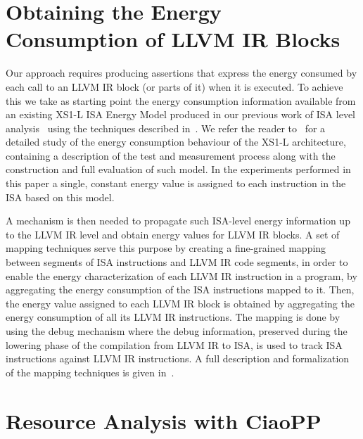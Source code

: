 \documentclass{llncs}
\newcommand{\level}{level\xspace}
\newcommand{\llvmir}{LLVM IR\xspace}
\begin{document}
\section{Obtaining the Energy Consumption of \llvmir Blocks}
\label{sec:energy-model}

Our approach requires producing assertions that express the energy
consumed by each call to an \llvmir block (or parts of it) when it is
executed. To achieve this we take as starting point the energy
consumption information available from an existing XS1-L ISA Energy
Model produced in our previous work of ISA level analysis~\cite{isa-energy-lopstr13-final}
using the techniques described in~\cite{Kerrison13}. 
We refer the reader to~\cite{Kerrison13} for a detailed study
of the energy consumption behaviour of the XS1-L architecture,
containing a description of the test and measurement process along
with the construction and full evaluation of such model. In the
experiments performed in this paper a single, constant energy value is
assigned to each instruction in the ISA based on this model.

A mechanism is then needed to propagate such ISA-\level energy
information up to the \llvmir \level and obtain energy values for
\llvmir blocks. A set of mapping techniques serve this purpose by
creating a fine-grained mapping between segments of ISA instructions
and \llvmir code segments, in order to enable the energy
characterization of each \llvmir instruction in a program, by
aggregating the energy consumption of the ISA instructions mapped to
it. Then, the energy value assigned to each \llvmir block is obtained
by aggregating the energy consumption of all its \llvmir
instructions. The mapping is done by using the debug mechanism 
where the debug information, preserved during the lowering phase 
of the compilation from \llvmir to ISA, is used to track ISA instructions 
against \llvmir instructions. A full description and formalization of the mapping techniques 
is given in~\cite{Georgiou2015arXiv}.

\section{Resource Analysis with CiaoPP} 
\label{sec:ciaopp-analysis}
\end{document}
